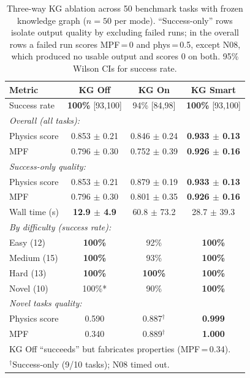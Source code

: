 \documentclass[preprint,review,12pt]{elsarticle}
\newif\ifrevisionsvisible
\newcommand{\revised}[1]{%
  \ifrevisionsvisible\textcolor{revisionred}{#1}\else#1\fi}
\begin{document}
\begin{table}[htbp]
\centering\footnotesize
\caption{Three-way KG ablation across 50 benchmark tasks with frozen
         knowledge graph ($n{=}50$ per mode).  ``Success-only'' rows isolate
         output quality by excluding failed runs; \revised{in the overall rows a
         failed run scores MPF\,=\,0 and phys\,=\,0.5, except N08, which
         produced no usable output and scores 0 on both.}  95\% Wilson CIs
         for success rate.}
\label{tab:ablation}
\setlength{\tabcolsep}{4pt}
\begin{tabular}{lccc}
\toprule
Metric & KG Off & KG On & KG Smart \\
\midrule
  Success rate          & \textbf{100\%} [93,100] & 94\% [84,98] & \textbf{100\%} [93,100]  \\[2pt]
\multicolumn{4}{l}{\textit{Overall (all tasks):}} \\
  \quad Physics score   & 0.853 $\pm$ 0.21 & 0.846 $\pm$ 0.24 & \textbf{0.933 $\pm$ 0.13} \\
  \quad MPF             & 0.796 $\pm$ 0.30 & 0.752 $\pm$ 0.39 & \textbf{0.926 $\pm$ 0.16} \\[2pt]
\multicolumn{4}{l}{\textit{Success-only quality:}} \\
  \quad Physics score   & 0.853 $\pm$ 0.21 & 0.879 $\pm$ 0.19 & \textbf{0.933 $\pm$ 0.13} \\
  \quad MPF             & 0.796 $\pm$ 0.30 & 0.801 $\pm$ 0.35 & \textbf{0.926 $\pm$ 0.16} \\[2pt]
  Wall time (s)         & \textbf{12.9 $\pm$ 4.9} & 60.8 $\pm$ 73.2 & 28.7 $\pm$ 39.3 \\
\midrule
\multicolumn{4}{l}{\textit{By difficulty (success rate):}} \\
  \quad Easy (12)       & \textbf{100\%}  & 92\%  & \textbf{100\%}  \\
  \quad Medium (15)     & \textbf{100\%}  & 93\%  & \textbf{100\%} \\
  \quad Hard (13)       & \textbf{100\%}  & \textbf{100\%}  & \textbf{100\%}  \\
  \quad Novel (10)      & 100\%* & 90\%  & \textbf{100\%}  \\
\midrule
\multicolumn{4}{l}{\textit{Novel tasks quality:}} \\
  \quad Physics score   & 0.590  & 0.887$^\dagger$ & \textbf{0.999} \\
  \quad MPF             & 0.340  & 0.889$^\dagger$ & \textbf{1.000} \\
\bottomrule
\multicolumn{4}{l}{\scriptsize *KG Off ``succeeds'' but fabricates properties (MPF\,=\,0.34).}\\
\multicolumn{4}{l}{\scriptsize $^\dagger$Success-only (9/10 tasks); N08 timed out.}\\
\end{tabular}
\end{table}
\end{document}
